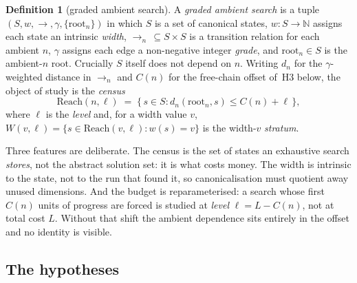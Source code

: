 \documentclass[11pt,a4paper]{article}
\theoremstyle{plain}
\theoremstyle{definition}
\newtheorem{definition}[theorem]{Definition}
\theoremstyle{remark}
\newcommand{\Reach}{\mathrm{Reach}}
\newcommand{\wid}{w}
\begin{document}
\begin{definition}[graded ambient search]\label{def:gas}
A \emph{graded ambient search} is a tuple $(S, \wid, \to, \gamma,
\{\mathrm{root}_n\})$ in which $S$ is a set of canonical states,
$\wid : S \to \mathbb{N}$ assigns each state an intrinsic \emph{width},
$\to_n\, \subseteq S \times S$ is a transition relation for each ambient $n$,
$\gamma$ assigns each edge a non-negative integer \emph{grade}, and
$\mathrm{root}_n \in S$ is the ambient-$n$ root. Crucially $S$ itself does not
depend on $n$. Writing $d_n$ for the $\gamma$-weighted distance in $\to_n$ and
$C(n)$ for the free-chain offset of~H3 below, the object of study is the
\emph{census}
\[
\Reach(n,\ell) \;=\; \{\, s \in S : d_n(\mathrm{root}_n, s) \le C(n) + \ell \,\},
\]
where $\ell$ is the \emph{level} and, for a width value $v$,
$W(v,\ell) = \{s \in \Reach(v,\ell) : \wid(s) = v\}$ is the width-$v$
\emph{stratum}.
\end{definition}

Three features are deliberate. The census is the set of states an exhaustive
search \emph{stores}, not the abstract solution set: it is what costs money.
The width is intrinsic to the state, not to the run that found it, so
canonicalisation must quotient away unused dimensions. And the budget is
reparameterised: a search whose first $C(n)$ units of progress are forced is
studied at \emph{level} $\ell = L - C(n)$, not at total cost $L$. Without that
shift the ambient dependence sits entirely in the offset and no identity is
visible.

\subsection{The hypotheses}
\end{document}
